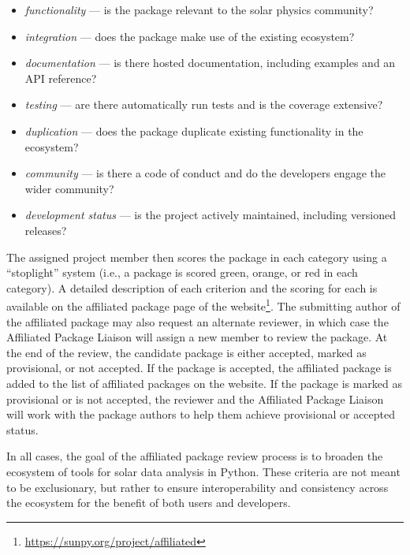 \begin{itemize}
    \item \textit{functionality} --- is the package relevant to the solar physics community?
    \item \textit{integration} --- does the package make use of the existing ecosystem?
    \item \textit{documentation} --- is there hosted documentation, including examples and an API reference?
    \item \textit{testing} --- are there automatically run tests and is the coverage extensive?
    \item \textit{duplication} --- does the package duplicate existing functionality in the ecosystem?
    \item \textit{community} --- is there a code of conduct and do the developers engage the wider community?
    \item \textit{development status} --- is the project actively maintained, including versioned releases?
\end{itemize}

The assigned project member then scores the package in each category using a \enquote{stoplight} system (i.e., a package is scored green, orange, or red in each category).
A detailed description of each criterion and the scoring for each is available on the affiliated package page of the \sunpyproj website\footnote{\url{https://sunpy.org/project/affiliated}}.
The submitting author of the affiliated package may also request an alternate reviewer, in which case the Affiliated Package Liaison will assign a new \sunpyproj member to review the package.
At the end of the review, the candidate package is either accepted, marked as provisional, or not accepted.
If the package is accepted, the affiliated package is added to the list of affiliated packages on the \sunpyproj website.
If the package is marked as provisional or is not accepted, the reviewer and the Affiliated Package Liaison will work with the package authors to help them achieve provisional or accepted status.

In all cases, the goal of the affiliated package review process is to broaden the ecosystem of tools for solar data analysis in Python.
These criteria are not meant to be exclusionary, but rather to ensure interoperability and consistency across the ecosystem for the benefit of both users and developers.

